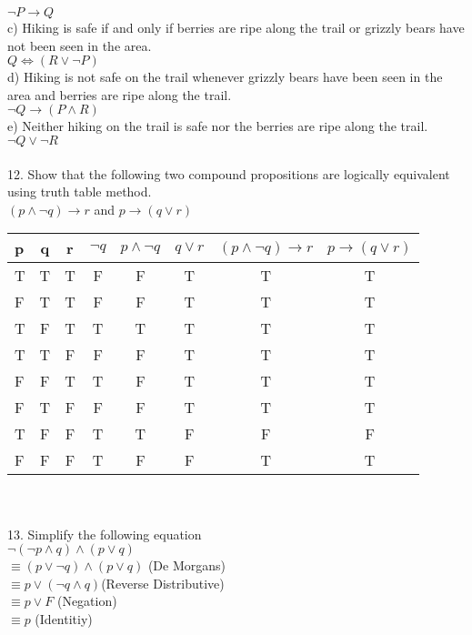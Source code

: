 \documentclass[11pt, oneside]{article}   	%
\begin{document}
\indent $\neg P\to Q$\\
c) Hiking is safe if and only if berries are ripe along the trail or grizzly bears have not been seen in the area.\\
\indent$ Q\iff (R\lor\neg P)$\\
d) Hiking is not safe on the trail whenever grizzly bears have been seen in the area and berries are ripe along the trail.\\
\indent $ \neg Q\to (P\wedge R)$\\
e) Neither hiking on the trail is safe nor the berries are ripe along the trail.\\
\indent$ \neg Q\lor\neg R$\\\\
12. Show that the following two compound propositions are logically equivalent using truth table method.\\$(p\wedge\neg q)\to r $ and $p\to (q\lor r)$\\

 \indent \begin{tabular} {| l | c | c | c | c | c || c || c ||}
  \hline
  p & q & r & $\neg q$ & $p\wedge\neg q$ & $q\lor r$ & $(p\wedge\neg q)\to r$ & $p\to (q\lor r)$ \\ \hline
  T & T & T & F & F & T & T & T \\ \hline
  F & T & T & F & F & T & T & T\\ \hline
  T & F & T & T & T & T & T & T \\ \hline
  T & T & F & F & F & T & T & T \\ \hline
  F & F & T & T & F & T & T & T \\ \hline
  F & T & F & F & F & T & T & T \\ \hline
  T & F & F & T & T & F & F & F \\ \hline
  F & F & F & T & F & F & T & T  \\ \hline
\end{tabular}\\\\
13. Simplify the following equation \\
$\neg(\neg p \wedge q)\wedge (p\lor q)$\\
$\equiv (p\lor\neg q)\wedge (p\lor q)$ (De Morgans)\\
$\equiv p\lor (\neg q\wedge q) $(Reverse Distributive)\\
$\equiv p\lor F$ (Negation)\\
$\equiv p$ (Identitiy)\\
\end{document}
